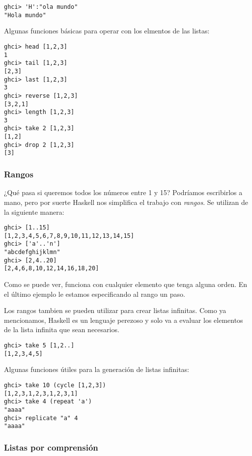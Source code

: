 \begin{lstlisting}
ghci> 'H':"ola mundo"
"Hola mundo"
\end{lstlisting}

Algunas funciones básicas para operar con los elmentos de las listas:

\begin{lstlisting}
ghci> head [1,2,3]
1
ghci> tail [1,2,3]
[2,3]
ghci> last [1,2,3]
3
ghci> reverse [1,2,3]
[3,2,1]
ghci> length [1,2,3]
3
ghci> take 2 [1,2,3]
[1,2]
ghci> drop 2 [1,2,3]
[3]
\end{lstlisting}

\subsubsection{Rangos} %
\label{ssub:rangos}

¿Qué pasa si queremos todos los números entre 1 y 15? Podríamos escribirlos a mano, pero por suerte Haskell nos simplifica el trabajo con \textit{rangos}. Se utilizan de la siguiente manera:

\begin{lstlisting}
ghci> [1..15]
[1,2,3,4,5,6,7,8,9,10,11,12,13,14,15]
ghci> ['a'..'n']
"abcdefghijklmn"
ghci> [2,4..20]
[2,4,6,8,10,12,14,16,18,20]
\end{lstlisting}

Como se puede ver, funciona con cualquier elemento que tenga alguna orden. En el último ejemplo le estamos especificando al rango un paso.

Los rangos tambien se pueden utilizar para crear listas infinitas. Como ya mencionamos, Haskell es un lenguaje perezoso y solo va a evaluar los elementos de la lista infinita que sean necesarios.

\begin{lstlisting}
ghci> take 5 [1,2..]
[1,2,3,4,5]
\end{lstlisting}

Algunas funciones útiles para la generación de listas infinitas:

\begin{lstlisting}
ghci> take 10 (cycle [1,2,3])
[1,2,3,1,2,3,1,2,3,1]
ghci> take 4 (repeat 'a')
"aaaa"
ghci> replicate "a" 4
"aaaa"
\end{lstlisting}

\subsubsection{Listas por comprensión} %
\label{ssub:listas_por_comprensi_n}

